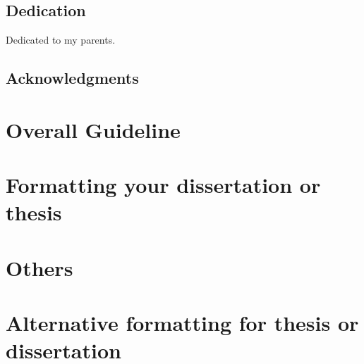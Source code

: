 \documentclass[letterpaper,12pt]{report}
\begin{document}
\setcounter{page}{0}



\newpage
\onehalfspace
\begin{abstract}

\end{abstract}

\doublespacing

\newpage
\begin{center}
\section*{Dedication}
Dedicated to my parents.
\end{center}

\newpage
\section*{Acknowledgments}


\newpage
\renewcommand*\contentsname{Table of Contents}
\tableofcontents

\newpage
\listoftables

\newpage
\listoffigures

\newpage

\setcounter{page}{1}
\linespread{2}

\chapter{ Overall Guideline }\label{chap:intro}


\chapter{ Formatting your dissertation or thesis }\label{chap:related_work}


\chapter{ Others }\label{chap:prob_def}


\chapter{Alternative formatting for thesis or dissertation}\label{chap:gbplanner}



\renewcommand{\bibname}{ References }

\end{document}
